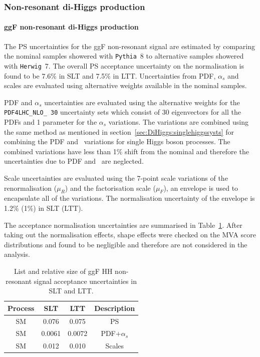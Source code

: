 \subsubsection{Non-resonant di-Higgs production}

\paragraph{ggF non-resonant di-Higgs production}
The PS uncertainties for the ggF non-resonant signal
are estimated by comparing the nominal samples showered with 
\texttt{Pythia}~8 to alternative samples showered with \texttt{Herwig}~7. 
The overall PS acceptance uncertainty
on the normalisation is found to be 
7.6\% in SLT and 7.5\% in LTT.
Uncertainties from PDF, $\alpha_s$ and scales are 
evaluated using alternative weights available in the nominal samples.

PDF and $\alpha_s$ uncertainties are evaluated
using the alternative weights for the \texttt{PDF4LHC\_NLO\_ 30}
uncertainty sets which consist of 30 eigenvectors for
all the PDFs and 1 parameter for the $\alpha_s$ variations.
The variations are combined using the same method as mentioned in 
section~\ref{sec:DiHiggs:singlehiggssysts} for combining the
PDF and \alphas\ variations for single Higgs boson processes.
The combined variations have less than 1\% shift from the nominal and
therefore the uncertainties due to PDF and \alphas\ are neglected.

Scale uncertainties are evaluated using the 7-point scale variations 
of the renormalisation ($\mu_R$) and the factorisation scale ($\mu_F$), 
an envelope is used to encapsulate all of the variations.
The normalisation uncertainty of the envelope is 1.2\% (1\%) in SLT (LTT).

The acceptance normalisation uncertainties are summarised in 
Table~\ref{sec:systs:tab:systematics_HHNonResSignal_AcceptanceNumbers}.
After taking out the normalisation effects, 
shape effects were checked on the MVA score distributions and found to 
be negligible and therefore are not considered in the analysis.

\begin{table}
\centering
\small
\begin{tabular}{|c|c|c|c|}
\hline
Process & SLT & LTT & Description\\
\hline
SM  & 0.076 & 0.075 & PS\\
SM &  0.0061 &  0.0072 & PDF+$\alpha_s$\\ 
SM & 0.012 &  0.010 & Scales \\
\hline
\end{tabular}
\caption{List and relative size of ggF HH non-resonant signal acceptance uncertainties in SLT and LTT.}
\label{sec:systs:tab:systematics_HHNonResSignal_AcceptanceNumbers}
\end{table}


